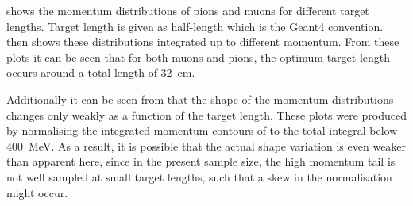  shows the momentum distributions of pions and muons for different target lengths.
Target length is given as half-length which is the Geant4 convention.  
 then shows these distributions integrated up to different momentum.
From these plots it can be seen that for both muons and pions, the optimum target length occurs around a total length of 32~cm.

Additionally it can be seen from
 that the shape of the
momentum distributions changes only weakly as a function of the target length.
These plots were produced by normalising the integrated momentum contours of
 to the total integral below
400~MeV.  As a result, it is possible that the actual shape variation is even
weaker than apparent here, since in the present sample size, the high momentum
tail is not well sampled at small target lengths, such that a skew in the
normalisation might occur.

